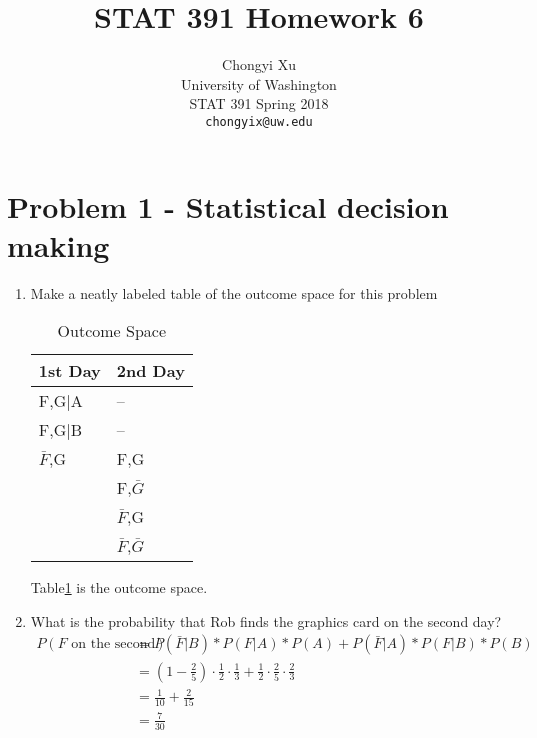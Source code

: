 \documentclass[preprint,12pt]{elsarticle}
\begin{document}
    \title{\LARGE \bf
        STAT 391 Homework 6
        }
        
        \author{ \parbox{3 in}{\centering Chongyi Xu \\
                 University of Washington\\
                 STAT 391 Spring 2018\\
                 {\tt\small chongyix@uw.edu}}
        }
    \maketitle

    \section{Problem 1 - Statistical decision making}
    \begin{enumerate}[label=\alph*]
        \item Make a neatly labeled table of the outcome space for
        this problem
        \begin{table}[]
			\centering
			\begin{tabular}{|l|l|}
			\hline
			1st Day     & 2nd Day             \\ \hline
			F,G|A     & --                  \\ \hline
			F,G|B     & --                    \\ \hline
			$\bar{F}$,G & F,G                 \\ \hline
						& F,$\bar{G}$         \\ \hline
						& $\bar{F}$,G         \\ \hline
						& $\bar{F}$,$\bar{G}$ \\ \hline
			\end{tabular}
			\caption{Outcome Space}
			\label{table1}
		\end{table}
		Table\ref{table1} is the outcome space.

        \item What is the probability that Rob finds the graphics card
        on the second day?
        \begin{align*}
			P(F\text{ on the second day}) &= P(\bar{F}|B) * P(F|A) * P(A) + P(\bar{F}|A) * P(F|B) * P(B)\\
			&= (1-\frac{2}{5}) \cdot \frac{1}{2} \cdot \frac{1}{3} + \frac{1}{2}\cdot \frac{2}{5}\cdot \frac{2}{3}\\
			&= \frac{1}{10} + \frac{2}{15}\\
			&= \frac{7}{30}
        \end{align*}


\end{enumerate}
\end{document}
